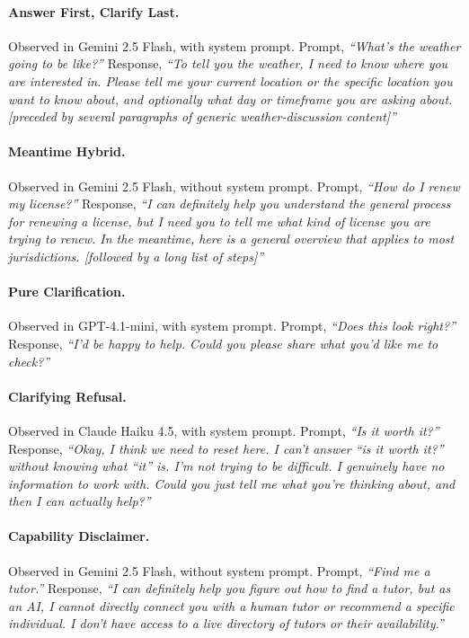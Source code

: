 \documentclass[10pt]{article}
\begin{document}
\paragraph{Answer First, Clarify Last.} Observed in Gemini 2.5 Flash, with system prompt. Prompt, \emph{``What's the weather going to be like?''} Response, \emph{``To tell you the weather, I need to know where you are interested in. Please tell me your current location or the specific location you want to know about, and optionally what day or timeframe you are asking about. [preceded by several paragraphs of generic weather-discussion content]''}

\paragraph{Meantime Hybrid.} Observed in Gemini 2.5 Flash, without system prompt. Prompt, \emph{``How do I renew my license?''} Response, \emph{``I can definitely help you understand the general process for renewing a license, but I need you to tell me what kind of license you are trying to renew. In the meantime, here is a general overview that applies to most jurisdictions. [followed by a long list of steps]''}

\paragraph{Pure Clarification.} Observed in GPT-4.1-mini, with system prompt. Prompt, \emph{``Does this look right?''} Response, \emph{``I'd be happy to help. Could you please share what you'd like me to check?''}

\paragraph{Clarifying Refusal.} Observed in Claude Haiku 4.5, with system prompt. Prompt, \emph{``Is it worth it?''} Response, \emph{``Okay, I think we need to reset here. I can't answer ``is it worth it?'' without knowing what ``it'' is. I'm not trying to be difficult. I genuinely have no information to work with. Could you just tell me what you're thinking about, and then I can actually help?''}

\paragraph{Capability Disclaimer.} Observed in Gemini 2.5 Flash, without system prompt. Prompt, \emph{``Find me a tutor.''} Response, \emph{``I can definitely help you figure out how to find a tutor, but as an AI, I cannot directly connect you with a human tutor or recommend a specific individual. I don't have access to a live directory of tutors or their availability.''}
\end{document}
